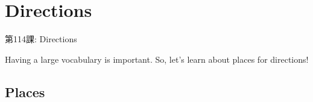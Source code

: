     
\chapter{Directions}

\begin{center}
\begin{Large}
第114課: Directions 
\end{Large}
\end{center}
 
\par{ Having a large vocabulary  is important. So, let's learn about places for directions! }
      
\section{Places}
  
